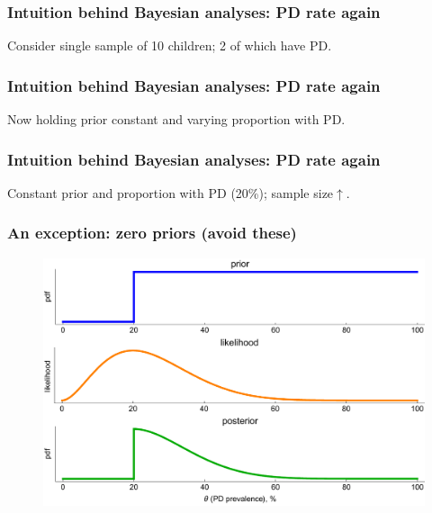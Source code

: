 \documentclass[handout]{beamer}
\begin{document}
\begin{frame}
	\frametitle{Intuition behind Bayesian analyses: PD rate again}
	Consider single sample of 10 children; 2 of which have PD.
	
	\begin{figure}[t]
		\centerline{}
	\end{figure}
\end{frame}

\begin{frame}
	\frametitle{Intuition behind Bayesian analyses: PD rate again}
	Now holding prior constant and varying proportion with PD.
	
	\begin{figure}[t]
		\centerline{}
	\end{figure}
\end{frame}

\begin{frame}
	\frametitle{Intuition behind Bayesian analyses: PD rate again}
	Constant prior and proportion with PD (20\%); sample size$\uparrow$.
	
	\begin{figure}[t]
		\centerline{}
	\end{figure}
\end{frame}

\begin{frame}
	\frametitle{An exception: zero priors (avoid these)}
	
	\begin{figure}
		\centerline{\includegraphics[width=1\textwidth]{./Animations/lec2_cuckooZeroPrior.pdf}}
	\end{figure}
	
\end{frame}
\end{document}
